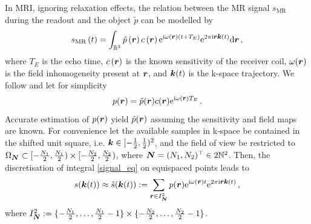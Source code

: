 \documentclass[journal]{IEEEtran}
\newcommand{\zb}[1]{\mbox{\boldmath{${#1}$}}}
\newcommand{\zbs}[1]{\mbox{\boldmath\scriptsize{${#1}$}}}
\newcommand{\zbss}[1]{\mbox{\boldmath\tiny{${#1}$}}}
\renewcommand{\d}{{\rm d}}
\numberwithin{equation}{section}
\numberwithin{table}{section}
\numberwithin{figure}{section}
\begin{document}
In MRI, ignoring relaxation effects, the relation between the MR signal
$s_{\text{MR}}$ during the readout and the object $\tilde p$ can be modelled by
\begin{equation}\label{signal_eq}
s_{\text{MR}}\left(t\right) =
\int_{\mathbb{R}^3} \tilde p \left(\zb r\right) c\left(\zb r\right)
{\rm e}^{{\rm\scriptsize i}\omega(\zbs r)(t+T_E)}
{\rm e}^{2\pi {\rm\scriptsize i}\zbs r \zbs k\left(t\right)} \d \zb r\, ,
\end{equation}
where $T_E$ is the echo time,  
$c\left(\zb r\right)$ is the known sensitivity of the receiver coil,
$\omega(\zb r)$ is the field inhomogeneity present at $\zb r$, 
and
$\zb k(t)$ is the k-space trajectory.
We follow \cite{SuNoFe03}  and let for simplicity
$$
p(\zb r)= \tilde p(\zb r) c(\zb r) 
{\rm e}^{{\rm\scriptsize i}\omega(\zbs r)T_E}\, .
$$
Accurate estimation of $p(\zb r)$ yield $\tilde p(\zb r)$ assuming the
sensitivity and field maps are known.
For convenience let the available samples in k-space be contained in the shifted unit square, i.e.
$\zb k \in [-\frac{1}{2},\frac{1}{2})^2$, and the field of view be restricted to 
$\Omega_{\zbs N} \subset [-\frac{N_1}{2},\frac{N_1}{2})\times[-\frac{N_2}{2},\frac{N_2}{2})$,
where $\zb N=(N_1,N_2)^{\top} \in 2\mathbb{N}^2$.
Then, the discretisation of integral \eqref{signal_eq} on equispaced points leads to
\begin{equation}\label{inverse2}
s(\zb k(t)) \approx \tilde{s}(\zb k(t)) := \sum_{\zbs r \in I^2_{\zbss
    N}} p(\zb r) 
{\rm e}^{{\rm\scriptsize i}\omega(\zbs r)t}
{\rm e}^{2\pi {\rm\scriptsize i}\zbs r \zbs k(t)}
\, ,
\end{equation}
where $I^2_{\zbs N} :=
\{-\frac{N_1}{2},\dots,\frac{N_1}{2}-1\}\times\{-\frac{N_2}{2},\dots,
\frac{N_2}{2}-1\}$.
\end{document}
